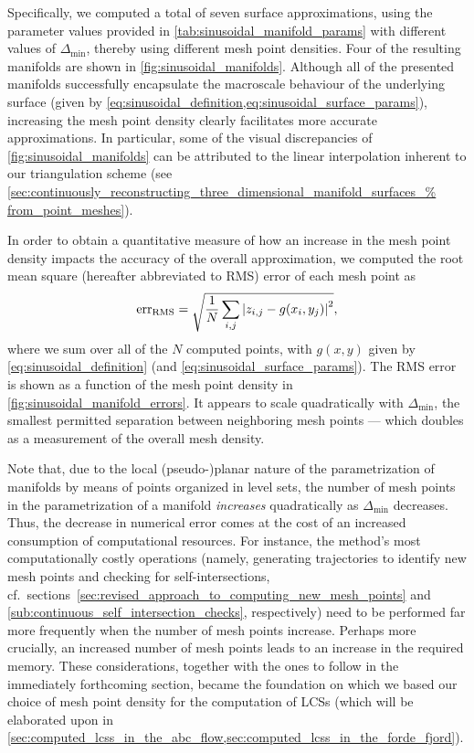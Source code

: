 Specifically, we computed a total of seven surface approximations, using
the parameter values provided in \cref{tab:sinusoidal_manifold_params} with
different values of $\Delta_{\min}$, thereby using different mesh point
densities. Four of the resulting manifolds are shown in
\cref{fig:sinusoidal_manifolds}. Although all of the presented manifolds
successfully encapsulate the macroscale behaviour of the underlying surface
(given by \cref{eq:sinusoidal_definition,eq:sinusoidal_surface_params}),
increasing the mesh point density clearly facilitates more accurate
approximations. In particular, some of the visual discrepancies of
\cref{fig:sinusoidal_manifolds} can be attributed to the linear interpolation
inherent to our triangulation scheme (see
\cref{sec:continuously_reconstructing_three_dimensional_manifold_surfaces_%
from_point_meshes}).





In order to obtain a quantitative measure of how an increase in the mesh
point density impacts the accuracy of the overall approximation, we
computed the root mean square (hereafter abbreviated to RMS) error of each mesh
point as
\begin{equation}
    \label{eq:sinusoidal_rms}
    \text{err}_{\text{RMS}} = \sqrt{\frac{1}{N}%
    \sum\limits_{i,j}\abs{z_{i,j}-g(x_{i},y_{j})}^{2}},
\end{equation}
where we sum over all of the $N$ computed points, with $g(x,y)$ given
by \cref{eq:sinusoidal_definition} (and \cref{eq:sinusoidal_surface_params}).
The RMS error is shown as a function of the mesh point density in
\cref{fig:sinusoidal_manifold_errors}. It appears to scale quadratically
with $\Delta_{\min}$, the smallest permitted separation between neighboring
mesh points --- which doubles as a measurement of the overall mesh density.



Note that, due to the local (pseudo-)planar nature of the parametrization of
manifolds by means of points organized in level sets, the number of mesh points
in the parametrization of a manifold \emph{increases} quadratically as
$\Delta_{\min}$ decreases. Thus, the decrease in numerical error comes at the
cost of an increased consumption of computational resources. For instance,
the method's most computationally costly operations (namely, generating
trajectories to identify new mesh points and checking for self-intersections,
cf.\ sections~\ref{sec:revised_approach_to_computing_new_mesh_points} and
\ref{sub:continuous_self_intersection_checks}, respectively) need to be
performed far more frequently when the number of mesh points increase.
Perhaps more crucially, an increased number of mesh points leads to an
increase in the required memory. These considerations, together with the
ones to follow in the immediately forthcoming section, became the foundation
on which we based our choice of mesh point density for the computation of
LCSs (which will be elaborated upon in
\cref{sec:computed_lcss_in_the_abc_flow,sec:computed_lcss_in_the_forde_fjord}).

